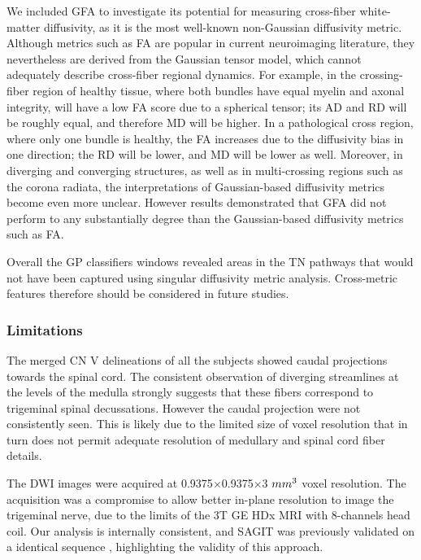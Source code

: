 We included GFA to investigate its potential for measuring cross-fiber white-matter diffusivity, as it is the most well-known non-Gaussian diffusivity metric. Although metrics such as FA are popular in current neuroimaging literature, they nevertheless are derived from the Gaussian tensor model, which cannot adequately describe cross-fiber regional dynamics. For example, in the crossing-fiber region of healthy tissue, where both bundles have equal myelin and axonal integrity, will have a low FA score due to a spherical tensor; its AD and RD will be roughly equal, and therefore MD will be higher. In a pathological cross region, where only one bundle is healthy, the FA increases due to the diffusivity bias in one direction; the RD will be lower, and MD will be lower as well. Moreover, in diverging and converging structures, as well as in multi-crossing regions such as the corona radiata, the interpretations of Gaussian-based diffusivity metrics become even more unclear. However results demonstrated that GFA did not perform to any substantially degree than the Gaussian-based diffusivity metrics such as FA. 

Overall the GP classifiers windows revealed areas in the TN pathways that would not have been captured using singular diffusivity metric analysis. Cross-metric features therefore should be considered in future studies. 

\subsubsection{Limitations}
The merged CN V delineations of all the subjects showed caudal projections towards the spinal cord. The consistent observation of diverging streamlines at the levels of the medulla strongly suggests that these fibers correspond to trigeminal spinal decussations. However the caudal projection were not consistently seen. This is likely due to the limited size of voxel resolution that in turn does not permit adequate resolution of medullary and spinal cord fiber details.

The DWI images were acquired at 0.9375$\times$0.9375$\times$3 $mm\textsuperscript{3}$ voxel resolution. The acquisition was a compromise to allow better in-plane resolution to image the trigeminal nerve, due to the limits of the 3T GE HDx MRI with 8-channels head coil. Our analysis is internally consistent, and SAGIT was previously validated on a identical sequence \cite{Chen2016,Chen2016a}, highlighting the validity of this approach. 

